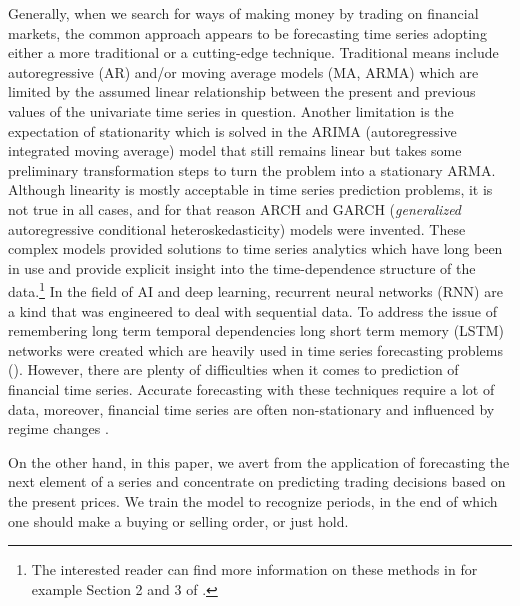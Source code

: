 \documentclass[12pt, a4paper]{article}
\begin{document}
Generally, when we search for ways of making money by trading on financial markets, the common approach appears to be forecasting time series adopting either a more traditional or a cutting-edge technique. 
Traditional means include autoregressive (AR) and/or moving average models (MA, ARMA) which are limited by the assumed linear relationship between the present and previous values of the univariate time series in question. 
Another limitation is the expectation of stationarity which is solved in the ARIMA (autoregressive integrated moving average) model that still remains linear but takes some preliminary transformation steps 
to turn the problem into a stationary ARMA. Although linearity is mostly acceptable in time series prediction problems, it is not true in all cases, and for that reason  
ARCH and GARCH (\textit{generalized} autoregressive conditional heteroskedasticity) models were invented. These complex models provided solutions to time series analytics which have long been in use and provide explicit insight into the time-dependence structure of the data.\footnote{The interested reader can find more information on these methods in for example Section 2 and 3 of \cite{tsay2005analysis}.}
In the field of AI and deep learning, recurrent neural networks (RNN) are a kind that was engineered to deal with sequential data. To address the issue of remembering long term temporal dependencies long 
short term memory (LSTM) networks were created which are heavily used in time series forecasting problems (\cite{Hochr97LSTM}). 
However, there are plenty of difficulties when it comes to prediction of financial time series. Accurate forecasting with these techniques require a lot of data, moreover, financial time series are often non-stationary and influenced by regime changes \cite{lemus_2018}.

On the other hand, in this paper, we avert from the application of forecasting the next element of a series and concentrate on predicting trading decisions based on the present prices. We train the model to recognize periods, in the end of which one should make a buying or selling order, or just hold.
\end{document}
